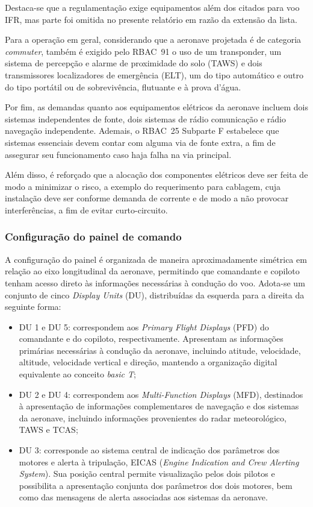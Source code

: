 Destaca-se que a regulamentação exige equipamentos além dos citados para voo
IFR, mas parte foi omitida no presente relatório em razão da extensão da lista.

Para a operação em geral, considerando que a aeronave projetada é de categoria
\textit{commuter}, também é exigido pelo RBAC~91 o uso de um transponder, um
sistema de percepção e alarme de proximidade do solo (TAWS) e dois transmissores
localizadores de emergência (ELT), um do tipo automático e outro do tipo
portátil ou de sobrevivência, flutuante e à prova d'água.

Por fim, as demandas quanto aos equipamentos elétricos da aeronave incluem dois
sistemas independentes de fonte, dois sistemas de rádio comunicação e rádio
navegação independente. Ademais, o RBAC~25 Subparte F estabelece que sistemas
essenciais devem contar com alguma via de fonte extra, a fim de assegurar seu
funcionamento caso haja falha na via principal.

Além disso, é reforçado que a alocação dos componentes elétricos deve ser feita
de modo a minimizar o risco, a exemplo do requerimento para cablagem, cuja
instalação deve ser conforme demanda de corrente e de modo a não provocar
interferências, a fim de evitar curto-circuito.


\subsubsection{Configuração do painel de comando}

A configuração do painel é organizada de maneira aproximadamente simétrica em
relação ao eixo longitudinal da aeronave, permitindo que comandante e copiloto
tenham acesso direto às informações necessárias à condução do voo. Adota-se um
conjunto de cinco \textit{Display Units} (DU), distribuídas da esquerda para a
direita da seguinte forma:

\begin{itemize}
    \item DU 1 e DU 5: correspondem aos
    \textit{Primary Flight Displays} (PFD) do comandante e do copiloto,
    respectivamente. Apresentam as informações primárias necessárias à condução
    da aeronave, incluindo atitude, velocidade, altitude, velocidade vertical e
    direção, mantendo a organização digital equivalente ao conceito
    \textit{basic T};

    \item DU 2 e DU 4: correspondem aos
    \textit{Multi-Function Displays} (MFD), destinados à apresentação de
    informações complementares de navegação e dos sistemas da aeronave,
    incluindo informações provenientes do radar meteorológico, TAWS e TCAS;

    \item DU 3: corresponde ao sistema central de indicação dos
    parâmetros dos motores e alerta à tripulação, EICAS
    (\textit{Engine Indication and Crew Alerting System}). Sua posição central
    permite visualização pelos dois pilotos e possibilita a apresentação
    conjunta dos parâmetros dos dois motores, bem como das mensagens de alerta
    associadas aos sistemas da aeronave.
\end{itemize}

